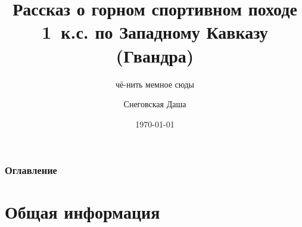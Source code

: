 \documentclass[
11pt, %
]{beamer}
\title[1 к.с. Гвандра 2024]{Рассказ о горном спортивном походе 1~к.с. по Западному Кавказу (Гвандра)} %
\subtitle{чё-нить мемное сюды} %
\author[Снеговская Даша]{Снеговская Даша} %
\institute[ГС МФТИ]{Горная секция МФТИ} %
\date[\today]{\today} %
\begin{document}
	
	
	\begin{frame}
		\titlepage %
	\end{frame}
	
	
	
	\begin{frame}
		\frametitle{Оглавление} %
		
		\tableofcontents %
	\end{frame}
	
	
	\section{Общая информация} %
	
\end{document}
